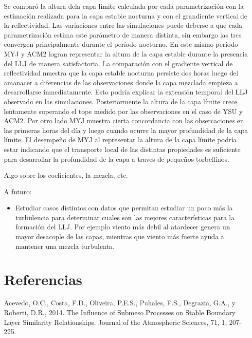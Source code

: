 \documentclass[12pt,spanish,oneside, a4paper]{book}
\providecommand{\tightlist}{%
  \setlength{\itemsep}{0pt}\setlength{\parskip}{0pt}}
\begin{document}
Se comparó la altura dela capa límite calculada por cada parametrización
con la estimación realizada para la capa estable nocturna y con el
grandiente vertical de la reflectividad. Las variaciones entre las
simulaciones puede deberse a que cada parametrización estima este
parámetro de manera distinta, sin embargo las tres convergen
principalmente durante el período nocturno. En este mismo período MYJ y
ACM2 logran representar la altura de la capa estable durante la
presencia del LLJ de manera satisfactoria. La comparación con el
gradiente vertical de reflectividad muestra que la capa estable nocturna
persiste dos horas luego del amanacer a diferencias de las observaciones
donde la capa mezclada empieza a desarrollarse inmediatamente. Esto
podría explicar la extensión temporal del LLJ observado en las
simulaciones. Posteriormente la altura de la capa límite crece
lentamente superando el tope medido por las observaciones en el caso de
YSU y ACM2. Por otro lado MYJ muestra cierta concordancia con las
obsercaciones en las primeras horas del día y luego cuando ocurre la
mayor profundidad de la capa límite. El desempeño de MYJ al representar
la altura de la capa límite podría estar indicando que el transporte
local de las distintas propiedades es suficiente para desarrollar la
profundidad de la capa a traves de pequeños torbellinos.

Algo sobre los coeficientes, la mezcla, etc.

A futuro:

\begin{itemize}
\tightlist
\item
  Estudiar casos distintos con datos que permitan estudiar un poco más
  la turbulencia para determinar cuales son las mejores características
  para la formación del LLJ. Por ejemplo viento más debil al atardecer
  genera un mayor desacople de las capas, mientras que viento más fuerte
  ayuda a mantener una mezcla turbulenta.
\end{itemize}

\chapter*{Referencias}\label{referencias}

\hypertarget{refs}{}
\hypertarget{ref-Acevedo2014}{}
Acevedo, O.C., Costa, F.D., Oliveira, P.E.S., Puhales, F.S., Degrazia,
G.A., y Roberti, D.R., 2014. The Influence of Submeso Processes on
Stable Boundary Layer Similarity Relationships. Journal of the
Atmospheric Sciences, 71, 1, 207-225.
\end{document}
